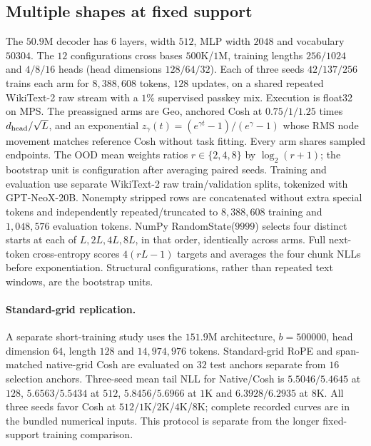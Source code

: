 \subsection{Multiple shapes at fixed support}
\label{sec:exact-range-factorial}
The $50.9$M decoder has $6$ layers, width $512$, MLP width $2048$ and
vocabulary $50304$. The $12$ configurations cross bases $500$K/$1$M,
training lengths $256/1024$ and $4/8/16$ heads (head dimensions $128/64/32$).
Each of three seeds $42/137/256$ trains each arm for $8{,}388{,}608$ tokens,
$128$ updates, on a shared repeated WikiText-2 raw stream with a $1\%$
supervised passkey mix. Execution is float32 on MPS. The preassigned arms are
Geo, anchored Cosh at $0.75/1/1.25$ times $d_{\rm head}/\sqrt L$, and an
exponential $z_\gamma(t)=(e^{\gamma t}-1)/(e^\gamma-1)$ whose RMS node
movement matches reference Cosh without task fitting. Every arm shares
sampled endpoints. The OOD mean weights ratios $r\in\{2,4,8\}$ by
$\log_2(r+1)$; the bootstrap unit is configuration after averaging paired seeds.
Training and evaluation use separate WikiText-2 raw train/validation splits,
tokenized with GPT-NeoX-20B. Nonempty stripped rows are concatenated without
extra special tokens and independently repeated/truncated to $8{,}388{,}608$
training and $1{,}048{,}576$ evaluation tokens. NumPy RandomState($9999$)
selects four distinct starts at each of $L,2L,4L,8L$, in that order, identically
across arms. Full next-token cross-entropy scores $4(rL-1)$ targets and averages
the four chunk NLLs before exponentiation. Structural configurations, rather
than repeated text windows, are the bootstrap units.


\paragraph{Standard-grid replication.}\label{sec:native-grid-control}
A separate short-training study uses the $151.9$M architecture, $b=500000$,
head dimension $64$, length $128$ and $14{,}974{,}976$ tokens. Standard-grid
RoPE and span-matched native-grid Cosh are evaluated on $32$ test anchors
separate from $16$ selection anchors. Three-seed mean tail NLL for Native/Cosh
is $5.5046/5.4645$ at $128$, $5.6563/5.5434$ at $512$,
$5.8456/5.6966$ at $1$K and $6.3928/6.2935$ at $8$K. All three seeds
favor Cosh at $512/1$K/$2$K/$4$K/$8$K; complete recorded curves are in the
bundled numerical inputs. This protocol is separate from the longer
fixed-support training comparison.

